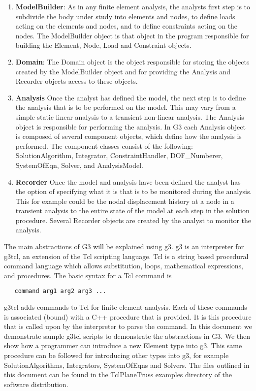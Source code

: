 \documentclass[12pt]{article}
\begin{document}
\begin{enumerate}
\item {\bf ModelBuilder}: As in any finite element analysis, the analysts first
step is to subdivide the body under study into elements and nodes,
to define loads acting on the elements and nodes, and to define constraints
acting on the nodes. The ModelBuilder object is that object in the program
responsible for building the Element, Node, Load and Constraint objects.

\item {\bf Domain}: The Domain object is the object responsible for
storing the objects created by the ModelBuilder object and for providing the
Analysis and Recorder objects access to these objects.

\item {\bf Analysis} Once the analyst has defined the model, the next step
is to define the analysis that is to be performed on the model. This
may vary from a simple static linear analysis to a transient
non-linear analysis. The Analysis object is responsible for performing
the analysis. In G3 each Analysis object is composed of several component
objects, which define how the analysis is performed. The component
classes consist of the following: { SolutionAlgorithm}, {
Integrator}, { ConstraintHandler}, { DOF\_Numberer}, {
SystemOfEqn}, { Solver}, and { AnalysisModel}. 

\item {\bf Recorder} Once the model and analysis have been defined the
analyst has the option of specifying what it is that is to be
monitored during the analysis. This for example could be the nodal
displacement history at a node in a transient analysis to the entire
state of the model at each step in the solution procedure. Several
Recorder objects are created by the analyst to monitor the analysis.
\end{enumerate}

The main abstractions of G3 will be explained using g3. g3 is an
interpreter for g3tcl, an extension of the Tcl scripting language.
Tcl is a string based procedural command language which allows substitution,
loops, mathematical expressions, and procedures. The basic syntax for
a Tcl command is   
{\sf\small
\begin{verbatim}
   command arg1 arg2 arg3 ...
\end{verbatim}
}

\noindent g3tcl adds commands to Tcl for finite element
analysis. Each of these commands is associated (bound) with a C++
procedure that is provided. It is this procedure that is called upon
by the interpreter to parse the command. In this document we
demonstrate sample g3tcl scripts to demonstrate the abstractions in
G3. We then show how a programmer can introduce a new Element type into
g3. This same procedure can be followed for introducing other types
into g3, for example SolutionAlgorithms, Integrators, SystemOfEqns and
Solvers. The files outlined in this document can be found in the
TclPlaneTruss examples directory of the software distribution.
\end{document}
